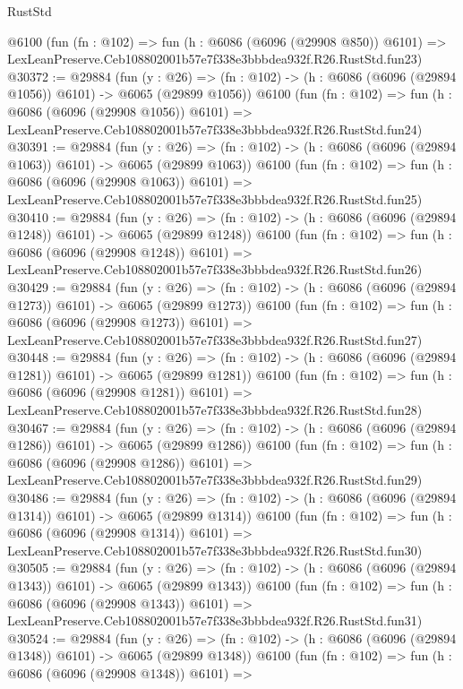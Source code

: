 \begin{lexlean}{RustStd}
\begin{coremodule}
    @6100
    (fun (fn : @102) =>
    fun (h : @6086 (@6096 (@29908 @850)) @6101) =>
    LexLeanPreserve.Ceb108802001b57e7f338e3bbbdea932f.R26.RustStd.fun23)
@30372 := @29884
    (fun (y : @26) =>
    (fn : @102) -> (h : @6086 (@6096 (@29894 @1056)) @6101) -> @6065 (@29899 @1056))
    @6100
    (fun (fn : @102) =>
    fun (h : @6086 (@6096 (@29908 @1056)) @6101) =>
    LexLeanPreserve.Ceb108802001b57e7f338e3bbbdea932f.R26.RustStd.fun24)
@30391 := @29884
    (fun (y : @26) =>
    (fn : @102) -> (h : @6086 (@6096 (@29894 @1063)) @6101) -> @6065 (@29899 @1063))
    @6100
    (fun (fn : @102) =>
    fun (h : @6086 (@6096 (@29908 @1063)) @6101) =>
    LexLeanPreserve.Ceb108802001b57e7f338e3bbbdea932f.R26.RustStd.fun25)
@30410 := @29884
    (fun (y : @26) =>
    (fn : @102) -> (h : @6086 (@6096 (@29894 @1248)) @6101) -> @6065 (@29899 @1248))
    @6100
    (fun (fn : @102) =>
    fun (h : @6086 (@6096 (@29908 @1248)) @6101) =>
    LexLeanPreserve.Ceb108802001b57e7f338e3bbbdea932f.R26.RustStd.fun26)
@30429 := @29884
    (fun (y : @26) =>
    (fn : @102) -> (h : @6086 (@6096 (@29894 @1273)) @6101) -> @6065 (@29899 @1273))
    @6100
    (fun (fn : @102) =>
    fun (h : @6086 (@6096 (@29908 @1273)) @6101) =>
    LexLeanPreserve.Ceb108802001b57e7f338e3bbbdea932f.R26.RustStd.fun27)
@30448 := @29884
    (fun (y : @26) =>
    (fn : @102) -> (h : @6086 (@6096 (@29894 @1281)) @6101) -> @6065 (@29899 @1281))
    @6100
    (fun (fn : @102) =>
    fun (h : @6086 (@6096 (@29908 @1281)) @6101) =>
    LexLeanPreserve.Ceb108802001b57e7f338e3bbbdea932f.R26.RustStd.fun28)
@30467 := @29884
    (fun (y : @26) =>
    (fn : @102) -> (h : @6086 (@6096 (@29894 @1286)) @6101) -> @6065 (@29899 @1286))
    @6100
    (fun (fn : @102) =>
    fun (h : @6086 (@6096 (@29908 @1286)) @6101) =>
    LexLeanPreserve.Ceb108802001b57e7f338e3bbbdea932f.R26.RustStd.fun29)
@30486 := @29884
    (fun (y : @26) =>
    (fn : @102) -> (h : @6086 (@6096 (@29894 @1314)) @6101) -> @6065 (@29899 @1314))
    @6100
    (fun (fn : @102) =>
    fun (h : @6086 (@6096 (@29908 @1314)) @6101) =>
    LexLeanPreserve.Ceb108802001b57e7f338e3bbbdea932f.R26.RustStd.fun30)
@30505 := @29884
    (fun (y : @26) =>
    (fn : @102) -> (h : @6086 (@6096 (@29894 @1343)) @6101) -> @6065 (@29899 @1343))
    @6100
    (fun (fn : @102) =>
    fun (h : @6086 (@6096 (@29908 @1343)) @6101) =>
    LexLeanPreserve.Ceb108802001b57e7f338e3bbbdea932f.R26.RustStd.fun31)
@30524 := @29884
    (fun (y : @26) =>
    (fn : @102) -> (h : @6086 (@6096 (@29894 @1348)) @6101) -> @6065 (@29899 @1348))
    @6100
    (fun (fn : @102) =>
    fun (h : @6086 (@6096 (@29908 @1348)) @6101) =>

\end{coremodule}
\end{lexlean}
